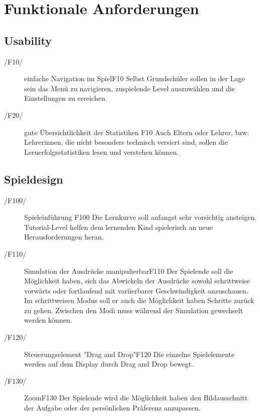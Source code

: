 \section{Funktionale Anforderungen}

\subsection{Usability}

\begin{description}
	\item[/F10/] einfache Navigation im Spiel{F10} \newline
	Selbst Grundschüler sollen in der Lage sein das Menü zu navigieren, zuspielende Level auszuwählen und die Einstellungen zu erreichen.
	\item[/F20/] gute Übersichtlichkeit der Statistiken {F10} \newline
	Auch  Eltern oder Lehrer, bzw. Lehrerinnen, die nicht besonders technisch versiert sind, sollen die Lernerfolgsstatistiken lesen und verstehen können.
\end{description}

\subsection{Spieldesign}

\begin{description}
	\item[/F100/] Spieleinführung {F100} \newline
	Die Lernkurve soll anfangst sehr vorsichtig ansteigen. Tutorial-Level helfen dem lernenden Kind spielerisch an neue Herausforderungen heran.
	\item[/F110/] Simulation der Ausdrücke manipulierbar{F110} \newline
	Der Spielende soll die Möglichkeit haben, sich das Abwickeln der Ausdrücke sowohl schrittweise vorwärts oder fortlaufend mit variierbarer Geschwindigkeit anzuschauen. Im schrittweisen Modus soll er auch die Möglichkeit haben Schritte zurück zu gehen. Zwischen den Modi muss während der Simulation gewechselt werden können.
	\item[/F120/] Steuerungselement "Drag and Drop"{F120} \newline
	Die einzelne Spielelemente werden auf dem Display durch Drag and Drop bewegt.
	\item[/F130/] Zoom{F130} \newline
	Der Spielende wird die Möglichkeit haben den Bildausschnitt der Aufgabe oder der persönlichen Präferenz anzupassen.	

\end{description}


